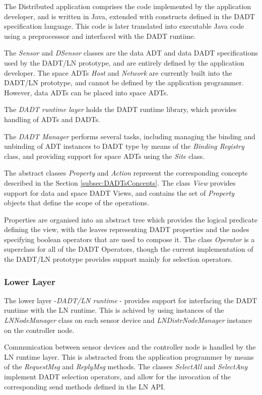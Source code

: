 The Distributed application comprises the code implemented by
the application developer, and is written in Java, extended with constructs defined in the DADT
specification language. This code is later  translated into executable Java
code using a preprocesssor and interfaced with the DADT runtime.

The \emph{Sensor} and \emph{DSensor} classes are the data
ADT and data DADT specifications used by the DADT/LN prototype, and are entirely
defined by the application developer. The space ADTs \emph{Host}
and \emph{Network} are currently built into the DADT/LN prototype, and cannot be defined by the application programmer. However, data ADTs can be placed into space ADTs.

The \emph{DADT runtime layer} holds the DADT runtime library, which provides
handling of ADTs and DADTs. 

The \emph{DADT Manager} performs several tasks, including managing the binding and unbinding
of ADT instances to DADT type by means of the  \emph{Binding Registry} class,
and providing support for space ADTs using the \emph{Site} class. 

The abstract classes \emph{Property} and \emph{Action} represent the
corresponding concepts described in the Section \ref{subsec:DADTsConcepts}.
The class \emph{View} provides support for data and space DADT Views, and
contains the set of \emph{Property} objects that define the scope of the
operations. 

Properties are organised into an abstract tree which provides the
logical predicate defining the view, with the leaves representing DADT
properties and the nodes specifying boolean operators that are used to compose it.
The class \emph{Operator} is a superclass for all of the DADT Operators, though
the current implementation of the DADT/LN prototype provides support mainly for
selection operators.

\subsubsection{Lower Layer}

The lower layer -\emph{DADT/LN runtime} - provides support for interfacing the DADT
runtime with the LN runtime. This is achived by using instances of the \emph{LNNodeManager} class on each sensor
device and \emph{LNDistrNodeManager} instance on the controller node. 

Communication between sensor devices and the controller node is handled by the LN
runtime layer. This is abstracted from the application programmer by means of the 
\emph{RequestMsg} and \emph{ReplyMsg} methods. The classes \emph{SelectAll} and
\emph{SelectAny} implement DADT selection operators, and allow for the invocation of
the corresponding send methods defined in the LN API.

